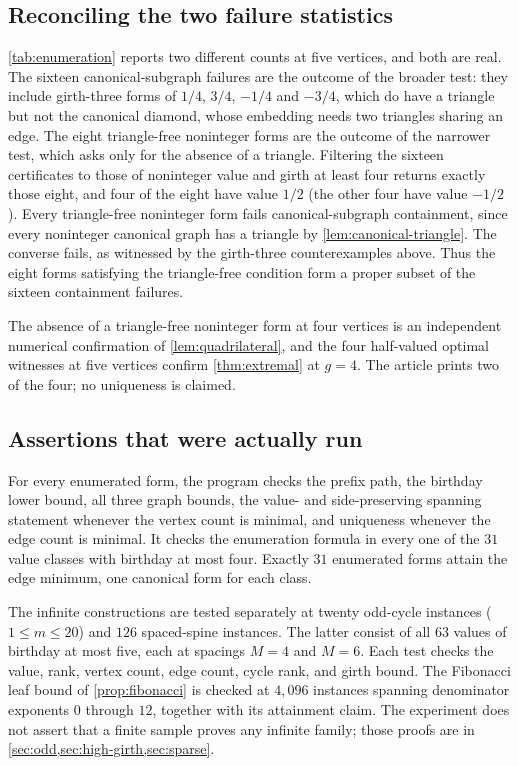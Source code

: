 \documentclass[11pt,a4paper]{article}
\numberwithin{equation}{section}
\theoremstyle{definition}
\theoremstyle{remark}
\begin{document}
\subsection{Reconciling the two failure statistics}

\cref{tab:enumeration} reports two different counts at five vertices, and both
are real. The sixteen canonical-subgraph failures are the outcome of the broader
test: they include girth-three forms of $1/4$, $3/4$, $-1/4$ and $-3/4$, which do
have a triangle but not the canonical diamond, whose embedding needs two
triangles sharing an edge. The eight triangle-free noninteger forms are the
outcome of the narrower test, which asks only for the absence of a triangle.
Filtering the sixteen certificates to those of noninteger value and girth at
least four returns exactly those eight, and four of the eight have value $1/2$
(the other four have value $-1/2$). Every triangle-free noninteger form fails
canonical-subgraph containment, since every noninteger canonical graph has a
triangle by \cref{lem:canonical-triangle}. The converse fails, as witnessed by
the girth-three counterexamples above. Thus the eight forms satisfying the
triangle-free condition form a proper subset of the sixteen containment failures.

The absence of a triangle-free noninteger form at four vertices is an
independent numerical confirmation of \cref{lem:quadrilateral}, and the four
half-valued optimal witnesses at five vertices confirm \cref{thm:extremal} at
$g=4$. The article prints two of the four; no uniqueness is claimed.

\subsection{Assertions that were actually run}

For every enumerated form, the program checks the prefix path, the birthday
lower bound, all three graph bounds, the value- and side-preserving spanning
statement whenever the vertex count is minimal, and uniqueness whenever the
edge count is minimal. It checks the enumeration formula in every one of the
$31$ value classes with birthday at most four. Exactly $31$ enumerated forms
attain the edge minimum, one canonical form for each class.

The infinite constructions are tested separately at twenty odd-cycle instances
($1\leq m\leq20$) and $126$ spaced-spine instances. The latter consist of all
$63$ values of birthday at most five, each at spacings $M=4$ and $M=6$. Each test
checks the value, rank, vertex count, edge count, cycle rank, and girth bound.
The Fibonacci leaf bound of \cref{prop:fibonacci} is checked at $4{,}096$
instances spanning denominator exponents $0$ through $12$, together with its
attainment claim. The experiment does not assert that a finite sample proves any
infinite family; those proofs are in
\cref{sec:odd,sec:high-girth,sec:sparse}.
\end{document}
